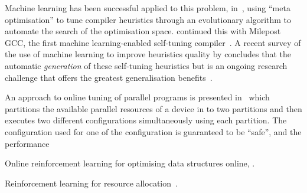 Machine learning has been successful applied to this problem,
in~\cite{Stephenson2003}, using ``meta optimisation'' to tune compiler
heuristics through an evolutionary algorithm to automate the search of
the optimisation space. \citeauthor{Fursin2011} continued this with
Milepost GCC, the first machine learning-enabled self-tuning
compiler~\cite{Fursin2011}. A recent survey of the use of machine
learning to improve heuristics quality by \citeauthor{Burke2013}
concludes that the automatic \emph{generation} of these self-tuning
heuristics but is an ongoing research challenge that offers the
greatest generalisation benefits~\cite{Burke2013}.


An approach to online tuning of parallel programs is presented in~\cite{Ansel2012} which partitions the available parallel resources of a device in to two partitions and then executes two different configurations simultaneously using each partition. The configuration used for one of the configuration is guaranteed to be ``safe'', and the performance

Online reinforcement learning for optimising data structures online, \cite{Tesauro2005}.

Reinforcement learning for resource allocation~\cite{Eastep2011}.



